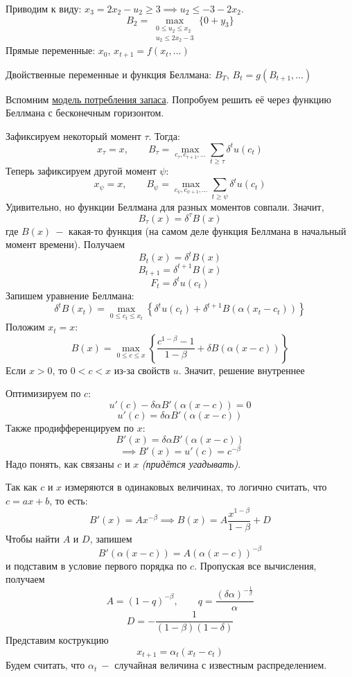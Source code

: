 \documentclass[a4paper,11pt]{article}
\begin{document}
Приводим к виду: $x_3 = 2x_2 - u_2 \geq 3\implies u_2 \leq -3 - 2x_2$.
\[B_2 = \max_{\substack{0\leq u_2 \leq x_2\\ u_2 \leq 2x_2 - 3}}\big\{0 + y_3\big\}\]
\newpage
{}
Прямые переменные: $x_0$, $x_{t+1} = f(x_t,\ldots)$

Двойственные переменные и функция Беллмана: $B_T$, $B_t = g(B_{t+1},\ldots)$

Вспомним \hyperlink{model1}{модель потребления запаса}. Попробуем решить её через функцию Беллмана с бесконечным горизонтом.

Зафиксируем некоторый момент $\tau$. Тогда:
\[x_\tau = x,\qquad B_\tau = \max_{c_\tau,c_{\tau+1},\ldots}\sum_{t\geq\tau}\delta^tu(c_t)\]
Теперь зафиксируем другой момент $\psi$:
\[x_\psi = x,\qquad B_\psi = \max_{c_\psi,c_{\psi+1},\ldots}\sum_{t\geq\psi}\delta^tu(c_t)\]
Удивительно, но функции Беллмана для разных моментов совпали. Значит,
\[B_\tau(x) = \delta^\tau B(x)\]
где $B(x)\ -$ какая-то функция (на самом деле функция Беллмана в начальный момент времени). Получаем
\[B_t(x) = \delta^tB(x)\]
\[B_{t+1} = \delta^{t+1}B(x)\]
\[F_t = \delta^tu(c_t)\]
Запишем уравнение Беллмана:
\[\delta^t B(x_t) = \max_{0\leq c_t\leq x_t}\left\{\delta^tu(c_t) + \delta^{t+1}B(\alpha(x_t - c_t))\right\}\]
Положим $x_t = x$:
\[B(x) = \max_{0\leq c\leq x}\left\{\frac{c^{1-\beta} - 1}{1 - \beta} + \delta B(\alpha(x - c))\right\}\]
Если $x > 0$, то $0 < c < x$ из-за свойств $u$. Значит, решение внутреннее

Оптимизируем по $c$:
\[u'(c) - \delta\alpha B'(\alpha(x - c)) = 0\]
\[u'(c) = \delta\alpha B'(\alpha(x - c))\]
Также продифференцируем по $x$:
\[B'(x) = \delta\alpha B'(\alpha(x - c))\]
\[\implies B'(x) = u'(c) = c^{-\beta}\]
Надо понять, как связаны $c$ и $x$ \textit{(придётся угадывать)}.

Так как $c$ и $x$ измеряются в одинаковых величинах, то логично считать, что $c = ax + b$, то есть:
\[B'(x) = Ax^{-\beta} \implies B(x) = A\frac{x^{1 - \beta}}{1 - \beta} + D\]
Чтобы найти $A$ и $D$, запишем
\[B'(\alpha(x - c)) = A(\alpha(x - c))^{-\beta}\]
и подставим в условие первого порядка по $c$. Пропуская все вычисления, получаем
\[A = (1 - q)^{-\beta},\qquad q = \frac{(\delta\alpha)^{-\frac{1}{\beta}}}{\alpha}\]
\[D = -\frac{1}{(1 - \beta)(1 - \delta)}\]
Представим кострукцию
\[x_{t+1} = \alpha_t(x_t - c_t)\]
Будем считать, что $\alpha_t\ -$ случайная величина с известным распределением.
\end{document}
